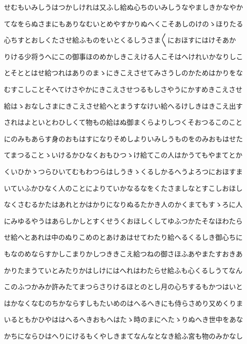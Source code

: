\documentclass[a4paper,11pt,landscape]{ltjtarticle}
\begin{document}
せむもいみしうはつかしけれは又ふし給ぬ心ちのいみしうなやましきかなやか
\par\medskip
てなをらぬさまにもありなむいとめやすかりぬへくこそあしのけのゝほりたる
\par\medskip
心ちすとおしくたさせ給ふものをいとくるしうさま〱におほすにはけそあか
\par\medskip
りける少将うへにこの御事ほのめかしきこえける人こそはへけれいかなりしこ
\par\medskip
とそととはせ給つれはありのまゝにきこえさせてみさうしのかためはかりをな
\par\medskip
むすこしことそへてけさやかにきこえさせつるもしさやうにかすめきこえさせ
\par\medskip
給はゝおなしさまにきこえさせ給へとまうすなけい給へるけしきはきこえ出す
\par\medskip
されはよといとわひしくて物もの給はぬ御まくらよりしつくそおつるこのこと
\par\medskip
にのみもあらす身のおもはすになりそめしよりいみしうものをのみおもはせた
\par\medskip
てまつることゝいけるかひなくおもひつゝけ給てこの人はかうてもやまてとか
\par\medskip
くいひかゝつらひいてむもわつらはしうきゝくるしかるへうよろつにおほすま
\par\medskip
いていふかひなく人のことによりていかなるなをくたさましなとすこしおほし
\par\medskip
なくさむるかたはあれとかはかりになりぬるたかき人のかくまてもすゝろに人
\par\medskip
にみゆるやうはあらしかしとすくせうくおほしくしてゆふつかたそなほわたら
\par\medskip
せ給へとあれは中のぬりこめのとあけあはせてわたり給へるくるしき御心ちに
\par\medskip
もなのめならすかしこまりかしつききこえ給つねの御さほふあやまたすおきあ
\par\medskip
かりたまうていとみたりかはしけにはへれはわたらせ給ふも心くるしうてなん
\par\medskip
このふつかみか許みたてまつらさりけるほとのとし月の心ちするもかつはいと
\par\medskip
はかなくなむのちかならすしもたいめのはへるへきにも侍らさめり又めくりま
\par\medskip
いるともかひやははへるへきおもへはたゝ時のまにへたゝりぬへき世中をあな
\par\medskip
かちにならひはへりにけるもくやしきまてなんなとなき給ふ宮も物のみかなし
\par\medskip
\end{document}
